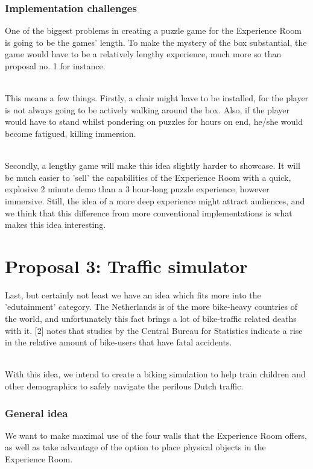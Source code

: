 \documentclass[11pt]{article}
\begin{document}
\subsubsection*{Implementation challenges}
One of the biggest problems in creating a puzzle game for the Experience Room is going to be the games' length. To make the mystery of the box substantial, the game would have to be a relatively lengthy experience, much more so than proposal no. 1 for instance.

~\\
This means a few things. Firstly, a chair might have to be installed, for the player is not always going to be actively walking around the box. Also, if the player would have to stand whilst pondering on puzzles for hours on end, he/she would become fatigued, killing immersion. 

~\\
Secondly, a lengthy game will make this idea slightly harder to showcase. It will be much easier to 'sell' the capabilities of the Experience Room with a quick, explosive 2 minute demo than a 3 hour-long puzzle experience, however immersive. Still, the idea of a more deep experience might attract audiences, and we think that this difference from more conventional implementations is what makes this idea interesting.


\newpage
{}
{}
\section*{Proposal 3:  Traffic simulator}
Last, but certainly not least we have an idea which fits more into the 'edutainment' category. The Netherlands is of the more bike-heavy countries of the world, and unfortunately this fact brings a lot of bike-traffic related deaths with it. [2] notes that studies by the Central Bureau for Statistics indicate a rise in the relative amount of bike-users that have fatal accidents. 

~\\
With this idea, we intend to create a biking simulation to help train children and other demographics to safely navigate the perilous Dutch traffic.

\subsubsection*{General idea}
We want to make maximal use of the four walls that the Experience Room offers, as well as take advantage of the option to place physical objects in the Experience Room. 
\end{document}
